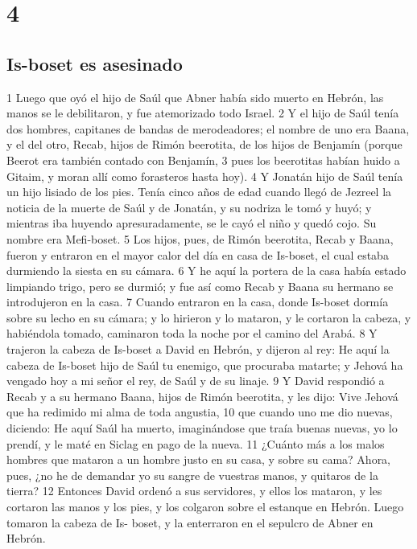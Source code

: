 \chapter{4}

\section*{Is-boset es asesinado}


1 Luego que oyó el hijo de Saúl que Abner había sido muerto en Hebrón, las manos se le debilitaron, y fue atemorizado todo Israel.
2 Y el hijo de Saúl tenía dos hombres, capitanes de bandas de merodeadores; el nombre de uno era Baana, y el del otro, Recab, hijos de Rimón beerotita, de los hijos de Benjamín (porque Beerot era también contado con Benjamín,
3 pues los beerotitas habían huido a Gitaim, y moran allí como forasteros hasta hoy).
4 Y Jonatán hijo de Saúl tenía un hijo lisiado de los pies. Tenía cinco años de edad cuando llegó de Jezreel la noticia de la muerte de Saúl y de Jonatán, y su nodriza le tomó y huyó; y mientras iba huyendo apresuradamente, se le cayó el niño y quedó cojo. Su nombre era Mefi-boset.
5 Los hijos, pues, de Rimón beerotita, Recab y Baana, fueron y entraron en el mayor calor del día en casa de Is-boset, el cual estaba durmiendo la siesta en su cámara.
6 Y he aquí la portera de la casa había estado limpiando trigo, pero se durmió; y fue así como Recab y Baana su hermano se introdujeron en la casa.
7 Cuando entraron en la casa, donde Is-boset dormía sobre su lecho en su cámara; y lo hirieron y lo mataron, y le cortaron la cabeza, y habiéndola tomado, caminaron toda la noche por el camino del Arabá.
8 Y trajeron la cabeza de Is-boset a David en Hebrón, y dijeron al rey: He aquí la cabeza de Is-boset hijo de Saúl tu enemigo, que procuraba matarte; y Jehová ha vengado hoy a mi señor el rey, de Saúl y de su linaje.
9 Y David respondió a Recab y a su hermano Baana, hijos de Rimón beerotita, y les dijo: Vive Jehová que ha redimido mi alma de toda angustia,
10 que cuando uno me dio nuevas, diciendo: He aquí Saúl ha muerto, imaginándose que traía buenas nuevas, yo lo prendí, y le maté en Siclag en pago de la nueva. 
11 ¿Cuánto más a los malos hombres que mataron a un hombre justo en su casa, y sobre su cama? Ahora, pues, ¿no he de demandar yo su sangre de vuestras manos, y quitaros de la tierra? 
12 Entonces David ordenó a sus servidores, y ellos los mataron, y les cortaron las manos y los pies, y los colgaron sobre el estanque en Hebrón. Luego tomaron la cabeza de Is- boset, y la enterraron en el sepulcro de Abner en Hebrón.

